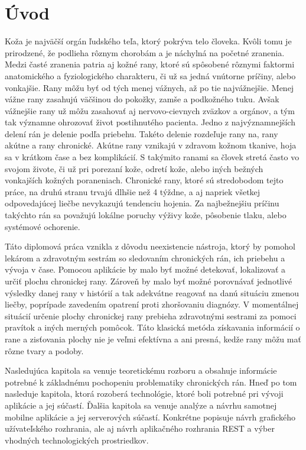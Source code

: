 \chapter{Úvod}
Koža je najväčší orgán ľudského teľa, ktorý pokrýva telo človeka. Kvôli tomu je prirodzené, že podlieha rôznym chorobám a je náchylná na početné zranenia. Medzi časté zranenia patria aj kožné rany, ktoré sú spôsobené rôznymi faktormi anatomického a fyziologického charakteru, či už sa jedná vnútorne príčiny, alebo vonkajšie. Rany môžu byť od tých menej vážnych, až po tie najvážnejšie. Menej vážne rany zasahujú väčšinou do pokožky, zamše a podkožného tuku. Avšak vážnejšie rany už môžu zasahovať aj nervovo-cievnych zväzkov a orgánov, a tým tak významne ohrozovať život postihnutého pacienta. Jedno z najvýznamnejších delení rán je delenie podľa priebehu. Takéto delenie rozdeľuje rany na, rany akútne a rany chronické. Akútne rany vznikajú v zdravom kožnom tkanive, hoja sa v krátkom čase a bez komplikácií. S takýmito ranami sa človek stretá často vo svojom živote, či už pri porezaní kože, odretí kože, alebo iných bežných vonkajších kožných poraneniach. Chronické rany, ktoré sú stredobodom tejto práce, na druhú stranu trvajú dlhšie než 4 týždne, a aj napriek všetkej odpovedajúcej liečbe nevykazujú tendenciu hojenia. Za najbežnejšiu príčinu takýchto rán sa považujú lokálne poruchy výživy kože, pôsobenie tlaku, alebo systémové ochorenie. 

Táto diplomová práca vznikla z dôvodu neexistencie nástroja, ktorý by pomohol lekárom a zdravotným sestrám so sledovaním chronických rán, ich priebehu a vývoja v čase. Pomocou aplikácie by malo byť možné detekovať, lokalizovať a určiť plochu chronickej rany. Zároveň by malo byť možné porovnávať jednotlivé výsledky danej rany v histórií a tak adekvátne reagovať na danú situáciu zmenou liečby, poprípade zavedením opatrení proti zhoršovaniu diagnózy. V momentálnej situácií určenie plochy chronickej rany prebieha zdravotnými sestrami za pomoci pravítok a iných merných pomôcok. Táto klasická metóda získavania informácií o rane a zisťovania plochy nie je veľmi efektívna a ani presná, kedže rany môžu mať rôzne tvary a podoby.
	
Nasledujúca kapitola sa venuje teoretickému rozboru a obsahuje informácie potrebné k základnému pochopeniu problematiky chronických rán. Hneď po tom nasleduje kapitola, ktorá rozoberá technológie, ktoré boli potrebné pri vývoji aplikácie a jej súčastí. Ďalšia kapitola sa venuje analýze a návrhu samotnej mobilne aplikácie a jej serverových súčastí. Konkrétne popisuje návrh grafického užívateľského rozhrania, ale aj návrh aplikačného rozhrania REST a výber vhodných technologických prostriedkov.

